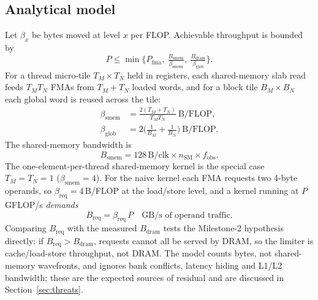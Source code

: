 \documentclass[conference]{IEEEtran}
\begin{document}
\subsection{Analytical model}
Let $\beta_x$ be bytes moved at level $x$ per FLOP. Achievable throughput is bounded by
\begin{equation}
P \le \min\Big\{P_{\mathrm{fma}},\ \tfrac{B_{\mathrm{smem}}}{\beta_{\mathrm{smem}}},\ \tfrac{B_{\mathrm{dram}}}{\beta_{\mathrm{glob}}}\Big\}.\label{eq:bound}
\end{equation}
For a thread micro-tile $T_M\times T_N$ held in registers, each shared-memory slab read feeds $T_MT_N$ FMAs from $T_M+T_N$ loaded words, and for a block tile $B_M\times B_N$ each global word is reused across the tile:
\begin{align}
\beta_{\mathrm{smem}} &= \frac{2(T_M+T_N)}{T_M T_N}\ \text{B/FLOP},\label{eq:bsmem}\\
\beta_{\mathrm{glob}} &= 2\Big(\frac1{B_M}+\frac1{B_N}\Big)\ \text{B/FLOP}.\label{eq:bglob}
\end{align}
The shared-memory bandwidth is
\begin{equation}
B_{\mathrm{smem}} = 128\,\text{B/clk} \times n_{\mathrm{SM}} \times f_{\mathrm{obs}}.\label{eq:Bsmem}
\end{equation}
The one-element-per-thread shared-memory kernel is the special case $T_M{=}T_N{=}1$ ($\beta_{\mathrm{smem}}=4$). For the naive kernel each FMA requests two 4-byte operands, so $\beta_{\mathrm{req}}=4$\,B/FLOP at the load/store level, and a kernel running at $P$ GFLOP/s \emph{demands}
\begin{equation}
B_{\mathrm{req}} = \beta_{\mathrm{req}}\,P \quad\text{GB/s of operand traffic.}\label{eq:req}
\end{equation}
Comparing $B_{\mathrm{req}}$ with the measured $B_{\mathrm{dram}}$ tests the Milestone-2 hypothesis directly: if $B_{\mathrm{req}}>B_{\mathrm{dram}}$, requests cannot all be served by DRAM, so the limiter is cache/load-store throughput, not DRAM. The model counts bytes, not shared-memory wavefronts, and ignores bank conflicts, latency hiding and L1/L2 bandwidth; these are the expected sources of residual and are discussed in Section~\ref{sec:threats}.
\end{document}
